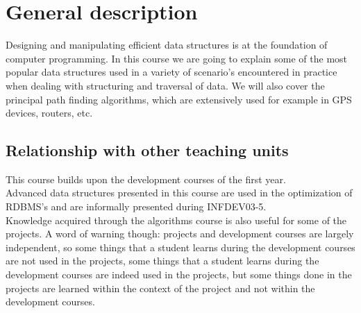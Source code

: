 \section{General description}
	Designing and manipulating efficient data structures is at the foundation of computer programming. In this course we are going to explain some of the most popular data structures used in a variety of scenario's encountered in practice when dealing with structuring and traversal of data. 
	We will also cover the principal path finding algorithms, which are extensively used for example in GPS devices, routers, etc.  \\

	\subsection{Relationship with other teaching units}
		This course builds upon the development courses of the first year.	\\		

		Advanced data structures presented in this course are used in the optimization of RDBMS's and are informally presented during INFDEV03-5. \\
		
		Knowledge acquired through the algorithms course is also useful for some of the projects. A word of warning though: projects and development courses are largely independent, so some things that a student learns during the development courses are not used in the projects, some things that a student learns during the development courses are indeed used in the projects, but some things done in the projects are learned within the context of the project and not within the development courses.
